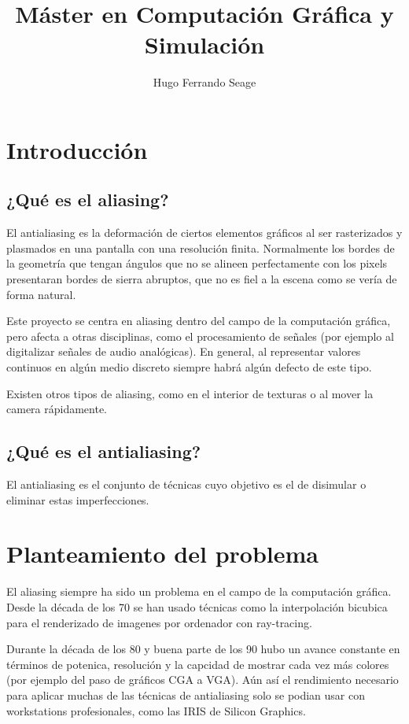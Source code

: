 \documentclass[withindex, glossary]{cam-thesis}
\title{Máster en Computación Gráfica y Simulación\protect\\\bigskip \normalfont{2018\protect\\\bigskip Trabajo Final de Máster\protect\\\bigskip Estudio sobre sistemas de anti-aliasing e implementación de anti-aliasing temporal}}
\author{Hugo Ferrando Seage}
\begin{document}
\frontmatter{}

\chapter{Introducción}
\section{¿Qué es el aliasing?}

El antialiasing es la deformación de ciertos elementos gráficos al ser rasterizados y plasmados en una pantalla con una resolución finita\cite{Mitchell:1988:RFC:378456.378514}. Normalmente los bordes de la geometría que tengan ángulos que no se alineen perfectamente con los pixels presentaran bordes de sierra abruptos, que no es fiel a la escena como se vería de forma natural.

Este proyecto se centra en aliasing dentro del campo de la computación gráfica, pero afecta a otras disciplinas, como el procesamiento de señales (por ejemplo al digitalizar señales de audio analógicas). En general, al representar valores continuos en algún medio discreto siempre habrá algún defecto de este tipo\cite{Mitchell:1988:RFC:378456.378514}.

Existen otros tipos de aliasing, como en el interior de texturas o al mover la camera rápidamente.

\section{¿Qué es el antialiasing?}

El antialiasing es el conjunto de técnicas cuyo objetivo es el de disimular o eliminar estas imperfecciones.

\chapter{Planteamiento del problema}

El aliasing siempre ha sido un problema en el campo de la computación gráfica. Desde la década de los 70 se han usado técnicas como la interpolación bicubica para el renderizado de imagenes por ordenador con ray-tracing.

Durante la década de los 80 y buena parte de los 90 hubo un avance constante en términos de potenica, resolución y la capcidad de mostrar cada vez más colores (por ejemplo del paso de gráficos CGA a VGA). Aún así el rendimiento necesario para aplicar muchas de las técnicas de antialiasing solo se podian usar con workstations profesionales, como las IRIS de Silicon Graphics.
\end{document}
